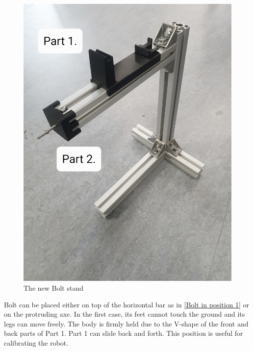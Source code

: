 \documentclass[a4paper,10pt]{article}
\begin{document}
\begin{figure}[H]
\centering
  \includegraphics[width=\linewidth, angle=0, scale=0.4]{./images/Bolt_stand_0.jpg}
  \caption{The new Bolt stand}
  \label{Bolt's stand}
\end{figure}

Bolt can be placed either on top of the horizontal bar as in \ref{Bolt in position 1} or on the protruding axe. In the first case, its feet cannot touch the ground and its legs can move freely. The body is firmly held due to the V-shape of the front and back parts of Part 1. Part 1 can slide back and forth. This position is useful for calibrating the robot.
\end{document}
